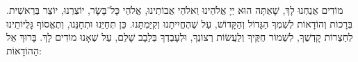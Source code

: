 מוֹדִים אֲנַחְנוּ לָךְ, שָׁאַתָּה הוּא יְיָ אֱלֹהֵינוּ וֵאלֹהֵי אֲבוֹתֵינוּ, אֱלֹהֵי כָּל־בָּשָׂר, יוֹצְרֵנוּ, יוֹצֵר בְּרֵאשִׁית. בְּרָכוֹת וְהוֹדָאוֹת לְשִׁמְךָ הַגָּדוֹל וְהַקָּדוֹשׁ, עַל שֶׁהֶחֱיִיתָנוּ וְקִיַּמְתָּנוּ. כֵּן תְּחַיֵּנוּ וּתְחָנֵּנוּ, וְתֶאֱסוֹף גָּלֻיּוֹתֵינוּ לְחַצְרוֹת קָדְשֶׁךָ, לִשְׁמוֹר חֻקֶּיךָ וְלַעֲשׂוֹת רְצוֹנְךָ, וּלְעָבְדְךָ בְּלֵבָב שָׁלֵם, עַל שֶׁאָנוּ מוֹדִים לָךְ. בָּרוּךְ אֵל הַהוֹדָאוֹת:
